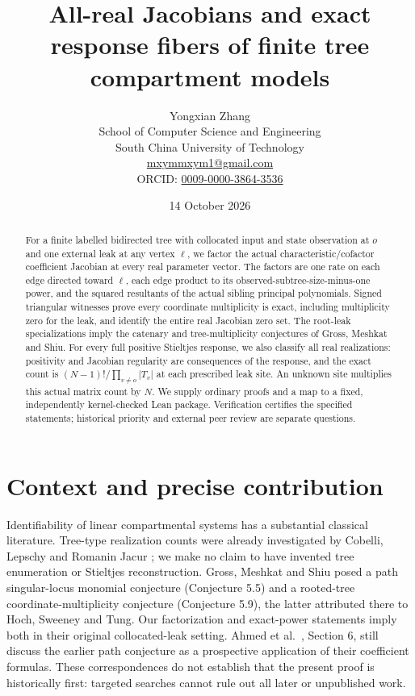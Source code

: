 \documentclass[11pt]{article}
\title{All-real Jacobians and exact response fibers\newline
of finite tree compartment models}
\author{Yongxian Zhang\\
\small School of Computer Science and Engineering\\
\small South China University of Technology\\
\small \href{mailto:mxymmxym1@gmail.com}{mxymmxym1@gmail.com}\\
\small ORCID: \href{https://orcid.org/0009-0000-3864-3536}{0009-0000-3864-3536}}
\date{14 October 2026}
\theoremstyle{remark}
\newcommand{\1}{\mathbf 1}
\begin{document}
\maketitle
\begin{abstract}
For a finite labelled bidirected tree with collocated input and state
observation at $o$ and one external leak at any vertex $\ell$, we factor the
actual characteristic/cofactor coefficient Jacobian at every real parameter
vector. The factors are one rate on each edge directed toward $\ell$, each
edge product to its observed-subtree-size-minus-one power, and the squared
resultants of the actual sibling principal polynomials. Signed triangular
witnesses prove every coordinate multiplicity is exact, including multiplicity
zero for the leak, and identify the entire real Jacobian zero set.
The root-leak specializations imply the catenary and tree-multiplicity
conjectures of Gross, Meshkat and Shiu. For every full positive Stieltjes
response, we also classify all real realizations: positivity and Jacobian
regularity are consequences of the response, and the exact count is
$(N-1)!/\prod_{v\ne o}|T_v|$ at each prescribed leak site. An unknown site
multiplies this actual matrix count by $N$. We supply ordinary proofs and a
map to a fixed, independently kernel-checked Lean package. Verification
certifies the specified statements; historical priority and external peer
review are separate questions.
\end{abstract}

\section{Context and precise contribution}
Identifiability of linear compartmental systems has a substantial classical
literature. Tree-type realization counts were already investigated by Cobelli,
Lepschy and Romanin Jacur \cite{CLR}; we make no claim to have invented tree
enumeration or Stieltjes reconstruction. Gross, Meshkat and Shiu
\cite{GMS} posed a path singular-locus monomial conjecture (Conjecture 5.5)
and a rooted-tree coordinate-multiplicity conjecture (Conjecture 5.9), the
latter attributed there to Hoch, Sweeney and Tung. Our factorization and
exact-power statements imply both in their original collocated-leak setting.
Ahmed et al.\ \cite{Ahmed}, Section 6, still discuss the earlier path
conjecture as a prospective application of their coefficient formulas.
These correspondences do not establish that the present proof is historically
first: targeted searches cannot rule out all later or unpublished work.
\end{document}
